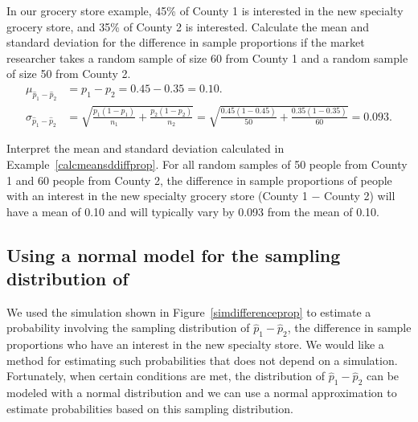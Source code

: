 \begin{examplewrap}
\begin{nexample}{In our grocery store example, 45\% of County 1 is interested in the new specialty grocery store, and 35\% of County 2 is interested.  Calculate the mean and standard deviation for the difference in sample proportions if the market researcher takes a random sample of size 60 from County 1 and a random sample of size 50 from County 2. }
\begin{align*}
\mu_{\hat{p}_1 - \hat{p}_2} &= p_1 - p_2 =0.45 - 0.35 = 0.10.\\
 \sigma_{\hat{p}_1-\hat{p}_2}&=  \sqrt{\frac{p_1(1-p_1)}{n_1} + \frac{p_2(1-p_2)}{n_2}} =\sqrt{\frac{0.45(1-0.45)}{50} + \frac{0.35(1-0.35)}{60}}=0.093.
\end{align*}
\label{calcmeansddiffprop}
\end{nexample}
\end{examplewrap}

\begin{examplewrap}
\begin{nexample}{Interpret the mean and standard deviation calculated in Example~\ref{calcmeansddiffprop}.}
For all random samples of 50 people from County 1 and 60 people from County 2, the difference in sample proportions of people with an interest in the new specialty grocery store (County 1 $-$ County 2) will have a mean of 0.10 and will typically vary by 0.093 from the mean of 0.10.
\end{nexample}
\end{examplewrap}


\subsection[Using a normal model for the sampling distribution of $\hat{p}_1-\hat{p}_2$]{Using a normal model for the sampling distribution of }

We used the simulation shown in Figure~\ref{simdifferenceprop} to estimate a probability involving the sampling distribution of $\hat{p}_1-\hat{p}_2$, the difference in sample proportions who have an interest in the new specialty store.  We would like a method for estimating such probabilities that does not depend on a simulation.  Fortunately, when certain conditions are met, the distribution of $\hat{p}_1-\hat{p}_2$ can be modeled with a normal distribution and we can use a normal approximation to estimate probabilities based on this sampling distribution.  

